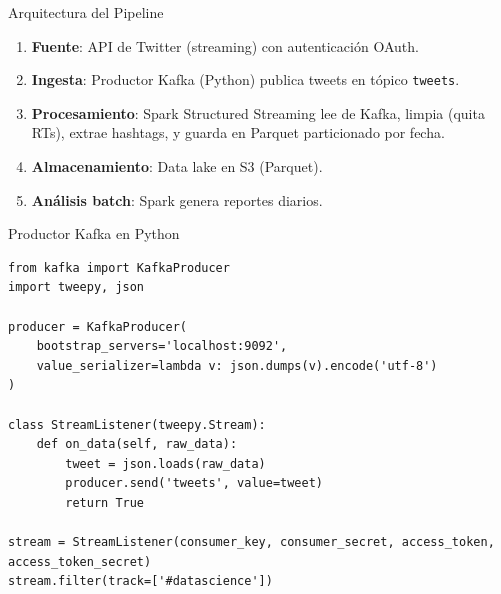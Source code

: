 \documentclass[aspectratio=169, 10pt, xcolor=table]{beamer}
\begin{document}
\begin{frame}{Arquitectura del Pipeline}
    \begin{enumerate}
        \item \textbf{Fuente}: API de Twitter (streaming) con autenticación OAuth.
        \item \textbf{Ingesta}: Productor Kafka (Python) publica tweets en tópico \texttt{tweets}.
        \item \textbf{Procesamiento}: Spark Structured Streaming lee de Kafka, limpia (quita RTs), extrae hashtags, y guarda en Parquet particionado por fecha.
        \item \textbf{Almacenamiento}: Data lake en S3 (Parquet).
        \item \textbf{Análisis batch}: Spark genera reportes diarios.
    \end{enumerate}
\end{frame}

\begin{frame}[fragile]{Productor Kafka en Python}
    \begin{lstlisting}[style=python]
from kafka import KafkaProducer
import tweepy, json

producer = KafkaProducer(
    bootstrap_servers='localhost:9092',
    value_serializer=lambda v: json.dumps(v).encode('utf-8')
)

class StreamListener(tweepy.Stream):
    def on_data(self, raw_data):
        tweet = json.loads(raw_data)
        producer.send('tweets', value=tweet)
        return True

stream = StreamListener(consumer_key, consumer_secret, access_token, access_token_secret)
stream.filter(track=['#datascience'])
    \end{lstlisting}
\end{frame}
\end{document}
